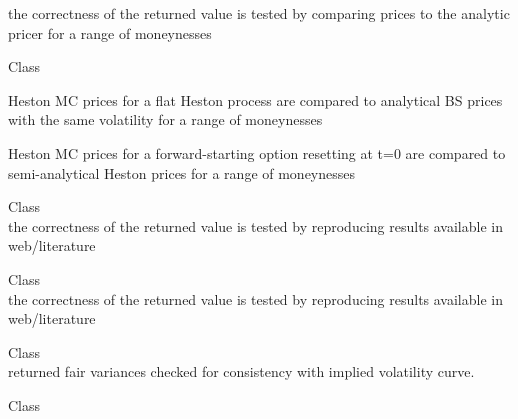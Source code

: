 \begin{DoxyRefList}
\begin{DoxyItemize}
\item the correctness of the returned value is tested by comparing prices to the analytic pricer for a range of moneynesses 
\end{DoxyItemize}
\item[Class \doxylink{class_quant_lib_1_1_m_c_forward_european_heston_engine}{Quant\+Lib\+::MCForward\+European\+Heston\+Engine\texorpdfstring{$<$}{<} RNG, S, P \texorpdfstring{$>$}{>}} ]\hfill \\
\label{test__test000125}%
%

\begin{DoxyItemize}
\item Heston MC prices for a flat Heston process are compared to analytical BS prices with the same volatility for a range of moneynesses
\item Heston MC prices for a forward-\/starting option resetting at t=0 are compared to semi-\/analytical Heston prices for a range of moneynesses 
\end{DoxyItemize}
\item[Class \doxylink{class_quant_lib_1_1_m_c_longstaff_schwartz_engine}{Quant\+Lib\+::MCLongstaff\+Schwartz\+Engine\texorpdfstring{$<$}{<} Generic\+Engine, MC, RNG, S, RNG\+\_\+\+Calibration \texorpdfstring{$>$}{>}} ]\hfill \\
\label{test__test000132}%
%
the correctness of the returned value is tested by reproducing results available in web/literature  
\item[Class \doxylink{class_quant_lib_1_1_m_c_longstaff_schwartz_path_engine}{Quant\+Lib\+::MCLongstaff\+Schwartz\+Path\+Engine\texorpdfstring{$<$}{<} Generic\+Engine, MC, RNG, S \texorpdfstring{$>$}{>}} ]\hfill \\
\label{test__test000012}%
%
the correctness of the returned value is tested by reproducing results available in web/literature  
\item[Class \doxylink{class_quant_lib_1_1_m_c_variance_swap_engine}{Quant\+Lib\+::MCVariance\+Swap\+Engine\texorpdfstring{$<$}{<} RNG, S \texorpdfstring{$>$}{>}} ]\hfill \\
\label{test__test000126}%
%
returned fair variances checked for consistency with implied volatility curve.  
\item[Class \doxylink{class_quant_lib_1_1_mersenne_twister_uniform_rng}{Quant\+Lib\+::Mersenne\+Twister\+Uniform\+Rng} ]\hfill \\

\end{DoxyRefList}
